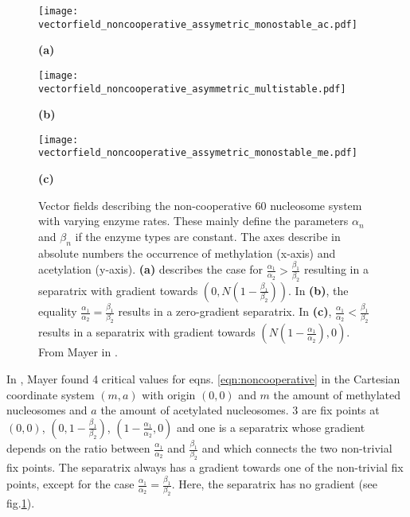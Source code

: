             \begin{figure}[!htbp]
                \centering
                \begin{minipage}{0.3\textwidth}
                    \texttt{[image: vectorfield\_noncooperative\_assymetric\_monostable\_ac.pdf]}
                    \caption*{\small \textbf{(a)}}
                \end{minipage}
                \begin{minipage}{0.3\textwidth}
                    \texttt{[image: vectorfield\_noncooperative\_asymmetric\_multistable.pdf]}
                    \caption*{\small \textbf{(b)}}
                \end{minipage}
                \begin{minipage}{0.3\textwidth}
                    \texttt{[image: vectorfield\_noncooperative\_assymetric\_monostable\_me.pdf]}
                    \caption*{\small \textbf{(c)}}
                \end{minipage}
               \caption{Vector fields describing the non-cooperative 60 nucleosome system with varying enzyme rates. These mainly define the parameters $\alpha_n$ and $\beta_n$ if the enzyme types are constant. The axes describe in absolute numbers the occurrence of methylation (x-axis) and acetylation (y-axis). \textbf{(a)} describes the case for $\frac{\alpha_1}{\alpha_2} > \frac{\beta_1}{\beta_2}$ resulting in a separatrix with gradient towards $(0,N(1-\frac{\beta_1}{\beta_2}))$. In \textbf{(b)}, the equality $\frac{\alpha_1}{\alpha_2} = \frac{\beta_1}{\beta_2}$ results in a zero-gradient separatrix. In \textbf{(c)}, $\frac{\alpha_1}{\alpha_2} < \frac{\beta_1}{\beta_2}$ results in a separatrix with gradient towards $(N(1-\frac{\alpha_1}{\alpha_2}),0)$. From Mayer in \cite{mayer2020langevin}.}
               \label{img:nonCooperativeVectorFields}
            \end{figure}

            In \cite{mayer2020langevin}, Mayer found 4 critical values for eqns. \ref{eqn:noncooperative} in the Cartesian coordinate system $(m,a)$ with origin $(0,0)$ and $m$ the amount of methylated nucleosomes and $a$ the amount of acetylated nucleosomes. 3 are fix points at $(0,0)$, $(0,1-\frac{\beta_1}{\beta_2})$, $(1-\frac{\alpha_1}{\alpha_2},0)$ and one is a separatrix whose gradient depends on the ratio between $\frac{\alpha_1}{\alpha_2}$ and $\frac{\beta_1}{\beta_2}$ and which connects the two non-trivial fix points. The separatrix always has a gradient towards one of the non-trivial fix points, except for the case $\frac{\alpha_1}{\alpha_2} = \frac{\beta_1}{\beta_2}$. Here, the separatrix has no gradient (see fig.\ref{img:nonCooperativeVectorFields}).

